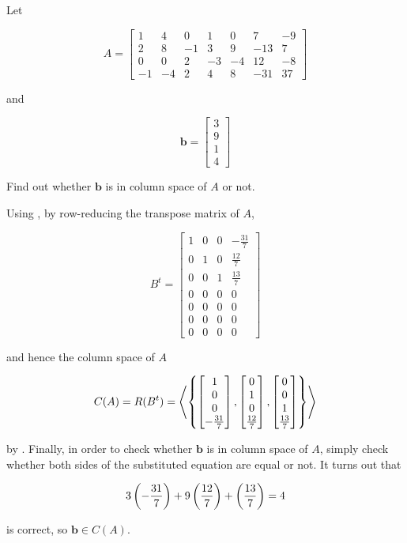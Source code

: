 \documentclass[a4paper,12pt]{article}
\begin{document}
\begin{exm}
  Let

  $$A=\begin{bmatrix}
    1 & 4 & 0 & 1 & 0 & 7 & -9\\
    2 & 8 & -1 & 3 & 9 & -13 & 7\\
    0 & 0 & 2 & -3 & -4 & 12 & -8\\
    -1 & -4 & 2 & 4 & 8 & -31 & 37
  \end{bmatrix}$$\s

  and

  $$\mathbf{b}=\begin{bmatrix}
    3\\
    9\\
    1\\
    4
  \end{bmatrix}$$\s

  Find out whether $\mathbf{b}$ is in column space of $A$ or not.\n

  \ans Using \rpst[\sctd{5}], by row-reducing the transpose matrix of $A$,

  $$B^{t}=\begin{bmatrix}
    1 & 0 & 0 & -\frac{31}{7}\\
    0 & 1 & 0 & \frac{12}{7}\\
    0 & 0 & 1 & \frac{13}{7}\\
    0 & 0 & 0 & 0\\
    0 & 0 & 0 & 0\\
    0 & 0 & 0 & 0\\
    0 & 0 & 0 & 0
  \end{bmatrix}$$\s

  and hence the column space of $A$

  $$C(A)=R(B^{t})=\left\langle \left\{ \begin{bmatrix}
    1\\
    0\\
    0\\
    -\frac{31}{7}
  \end{bmatrix},\begin{bmatrix}
    0\\
    1\\
    0\\
    \frac{12}{7}
  \end{bmatrix},\begin{bmatrix}
    0\\
    0\\
    1\\
    \frac{13}{7}
  \end{bmatrix}\right\}\right\rangle$$\s

  by \rthm[\sctd{2}]. Finally, in order to check whether $\mathbf{b}$ is in column space of $A$, simply check whether both sides of the substituted equation are equal or not. It turns out that

  $$3\left( -\frac{31}{7}\right)+9\left( \frac{12}{7}\right)+\left( \frac{13}{7}\right)=4$$\s

  is correct, so $\mathbf{b}\in C(A)$.
\end{exm}
\end{document}

